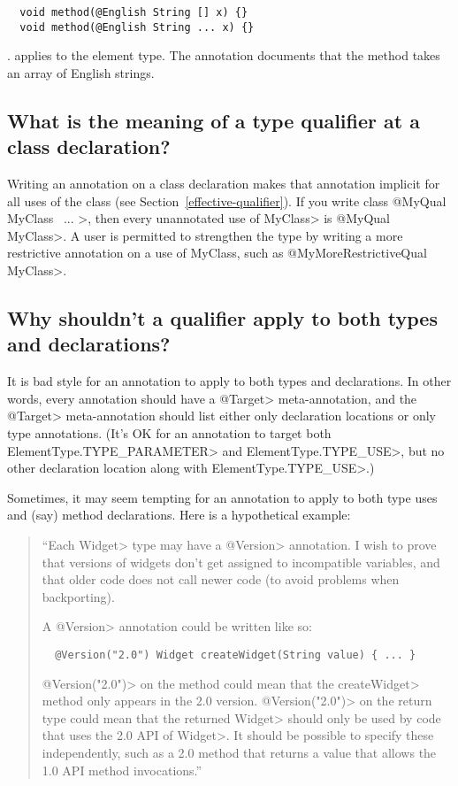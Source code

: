 \begin{Verbatim}
  void method(@English String [] x) {}
  void method(@English String ... x) {}
\end{Verbatim}

\noindent.
applies to the element type. The annotation documents that the method takes an array of English strings.


\subsection{What is the meaning of a type qualifier at a class declaration?\label{faq-type-qualifier-on-class-declaration}}


Writing an annotation on a class declaration makes that annotation implicit
for all uses of the class (see Section~\ref{effective-qualifier}).  If you
write \<class @MyQual MyClass \ttlcb\ ... \ttrcb>, then every unannotated
use of \<MyClass> is \<@MyQual MyClass>.  A user is permitted to strengthen
the type by writing a more restrictive annotation on a use of MyClass, such
as \<@MyMoreRestrictiveQual MyClass>.


\subsection{Why shouldn't a qualifier apply to both types and declarations?\label{faq-no-annotation-on-types-and-declarations}}

It is bad style for an annotation to apply to both types and declarations.
In other words, every annotation should have a \<@Target> meta-annotation,
and the \<@Target> meta-annotation should list either only declaration
locations or only type annotations.  (It's OK for an annotation to target
both \<ElementType.TYPE\_PARAMETER> and \<ElementType.TYPE\_USE>, but no
other declaration location along with \<ElementType.TYPE\_USE>.)

Sometimes, it may seem tempting for an annotation to apply to both type
uses and (say) method declarations.  Here is a hypothetical example:

\begin{quote}
  ``Each \<Widget> type may have a \<@Version> annotation.
  I wish to prove that versions of widgets don't get assigned to
  incompatible variables, and that older code does not call newer code (to
  avoid problems when backporting).

  A \<@Version> annotation could be written like so:

\begin{Verbatim}
  @Version("2.0") Widget createWidget(String value) { ... }
\end{Verbatim}

\<@Version("2.0")> on the method could mean that the \<createWidget> method
only appears in the 2.0 version.  \<@Version("2.0")> on the return type
could mean that the returned \<Widget> should only be used by code that
uses the 2.0 API of \<Widget>.  It should be possible to specify these
independently, such as a 2.0 method that returns a value that allows the
1.0 API method invocations.''
\end{quote}

